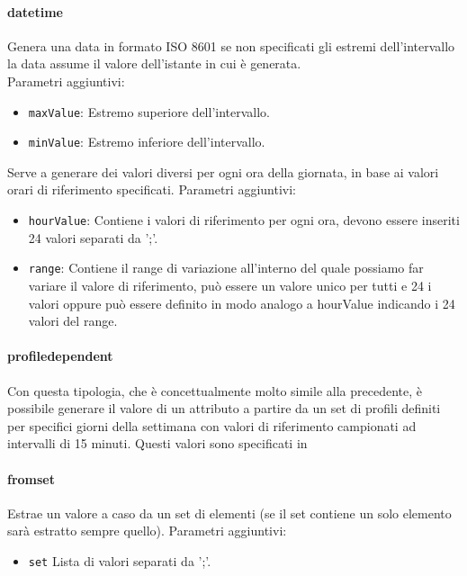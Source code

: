 \documentclass[12pt,a4paper,italian]{article}
\begin{document}
{{\paragraph{\large{datetime}} Genera una data in formato ISO 8601 se non specificati gli estremi dell'intervallo la data assume il valore dell'istante in cui è generata.\\
Parametri aggiuntivi:
\begin{itemize}
	\item \texttt{maxValue}: Estremo superiore dell'intervallo.
	\item \texttt{minValue}: Estremo inferiore dell'intervallo.
\end{itemize}
 Serve a generare dei valori diversi per ogni ora della giornata, in base ai valori orari di riferimento specificati.
Parametri aggiuntivi:
\begin{itemize}
	\item \texttt{hourValue}: Contiene i valori di riferimento per ogni ora, devono essere inseriti 24 valori separati da ';'. 
	\item \texttt{range}: Contiene il range di variazione all'interno del quale possiamo far variare il valore di riferimento, può essere un
	valore unico per tutti e 24 i valori oppure può essere definito in modo analogo a hourValue indicando i 24 valori del range.
\end{itemize}
\paragraph{\large{profiledependent}} Con questa tipologia, che è concettualmente molto simile alla precedente, è possibile generare il valore di un attributo a partire da un set di profili definiti per specifici giorni della settimana con
valori di riferimento campionati ad intervalli di 15 minuti. Questi valori sono specificati in 

\paragraph{\large{fromset}} Estrae un valore a caso da un set di elementi (se il set contiene un solo elemento sarà estratto sempre quello).
Parametri aggiuntivi:
\begin{itemize}
	\item \texttt{set} Lista di valori separati da ';'.
\end{itemize}
}}
\end{document}
